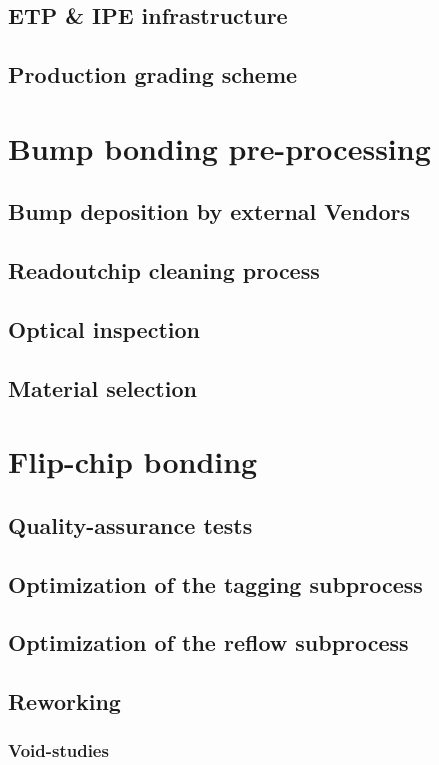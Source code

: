 \subsection{ETP \& IPE infrastructure}
\subsection{Production grading scheme}

\section{Bump bonding pre-processing}
\subsection{Bump deposition by external Vendors}
\subsection{Readoutchip cleaning process}
\subsection{Optical inspection}
\subsection{Material selection}

\section{Flip-chip bonding}
\subsection{Quality-assurance tests}
\subsection{Optimization of the tagging subprocess}
\subsection{Optimization of the reflow subprocess}
\subsection{Reworking}

\subsubsection{Void-studies}

